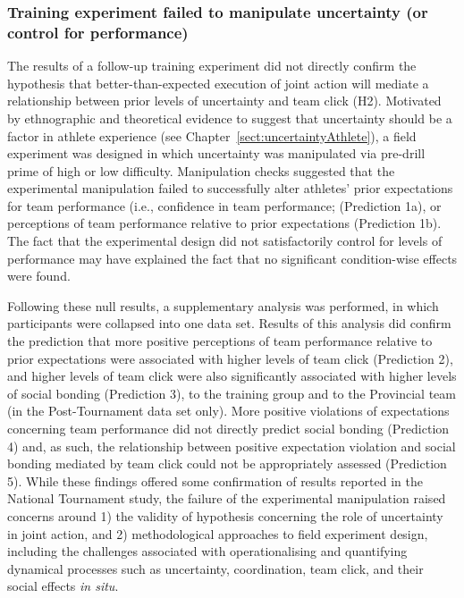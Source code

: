 \subsubsection{Training experiment failed to manipulate uncertainty (or control for performance)}
The results of a follow-up training experiment did not directly confirm the hypothesis that better-than-expected execution of joint action will mediate a relationship between prior levels of uncertainty and team click (H2).  Motivated by ethnographic and theoretical evidence to suggest that uncertainty should be a factor in athlete experience (see Chapter~\ref{sect:uncertaintyAthlete}), a field experiment was designed in which uncertainty was manipulated via pre-drill prime of high or low difficulty.  Manipulation checks suggested that the experimental manipulation failed to successfully alter athletes' prior expectations for team performance (i.e., confidence in team performance; (Prediction 1a), or perceptions of team performance relative to prior expectations (Prediction 1b).  The fact that the experimental design did not satisfactorily control for levels of performance may have explained the fact that no significant condition-wise effects were found.

Following these null results, a supplementary analysis was performed, in which participants were collapsed into one data set.  Results of this analysis did confirm the prediction that more positive perceptions of team performance relative to prior expectations were associated with higher levels of team click (Prediction 2), and higher levels of team click were also significantly associated with higher levels of social bonding (Prediction 3), to the training group and to the Provincial team (in the Post-Tournament data set only).  More positive violations of expectations concerning team performance did not directly predict social bonding (Prediction 4) and, as such, the relationship between positive expectation violation and social bonding mediated by team click could not be appropriately assessed (Prediction 5).  While these findings offered some confirmation of results reported in the National Tournament study, the failure of the experimental manipulation raised concerns around 1) the validity of hypothesis concerning the role of uncertainty in joint action, and 2) methodological approaches to field experiment design, including the challenges associated with operationalising and quantifying dynamical processes such as uncertainty, coordination, team click, and their social effects \textit{in situ}.

